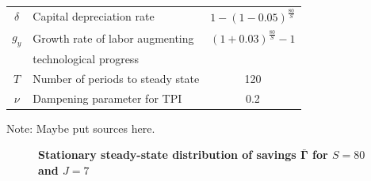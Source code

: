 \documentclass[letterpaper,12pt]{article}
\theoremstyle{definition}
\begin{document}
\begin{spacing}{1.5}
\begin{table}[htbp]
\begin{threeparttable}
\begin{tabular}{>{\small}c |>{\small}l |>{\small}c}
        $\delta$ & Capital depreciation rate & $1-(1-0.05)^\frac{80}{S}$ \\
        $g_y$ & Growth rate of labor augmenting & $(1+0.03)^\frac{80}{S}-1$ \\
        & \quad technological progress & \\
        $T$ & Number of periods to steady state & 120 \\
        $\nu$ & Dampening parameter for TPI & 0.2 \\
        \hline\hline
      \end{tabular}
      \begin{tablenotes}
        \scriptsize{\item[]Note: Maybe put sources here.}
      \end{tablenotes}
      \end{threeparttable}
    \end{table}

    \begin{figure}[htb]\centering \captionsetup{width=4.0in}
      \caption{\label{FigSavSS}\textbf{Stationary steady-state distribution of savings $\bar{\bm{\Gamma}}$ for $S=80$ and $J=7$}}
    \end{figure}


\end{spacing}
\end{document}
